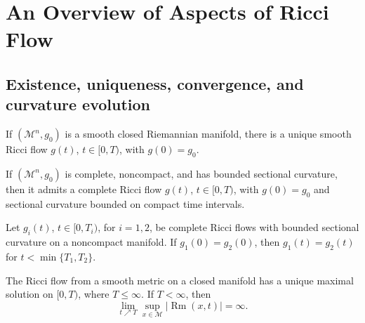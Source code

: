 \chapter{An Overview of Aspects of Ricci Flow}
\label{app:chow-ii-overview-ricci-flow}

\section{Existence, uniqueness, convergence, and curvature evolution}

\begin{theorem}
\label{thm:chow-ii-appd-short-time-existence-closed}

If $(\mathcal M^n,g_0)$ is a smooth closed Riemannian manifold, there is a
unique smooth Ricci flow $g(t)$, $t\in[0,T)$, with $g(0)=g_0$.
\end{theorem}

\begin{theorem}
\label{thm:chow-ii-appd-short-time-existence-complete}

If $(\mathcal M^n,g_0)$ is complete, noncompact, and has bounded sectional
curvature, then it admits a complete Ricci flow $g(t)$, $t\in[0,T)$, with
$g(0)=g_0$ and sectional curvature bounded on compact time intervals.
\end{theorem}

\begin{theorem}
\label{thm:chow-ii-appd-uniqueness-complete}

Let $g_i(t)$, $t\in[0,T_i)$, for $i=1,2$, be complete Ricci flows with
bounded sectional curvature on a noncompact manifold. If $g_1(0)=g_2(0)$,
then $g_1(t)=g_2(t)$ for $t<\min\{T_1,T_2\}$.
\end{theorem}

\begin{theorem}
\label{thm:chow-ii-appd-long-time-existence-closed}


The Ricci flow from a smooth metric on a closed manifold has a unique maximal
solution on $[0,T)$, where $T\leq\infty$. If $T<\infty$, then
\[
 \lim_{t\nearrow T}\sup_{x\in\mathcal M}|\operatorname{Rm}(x,t)|=\infty.
\]
\end{theorem}


